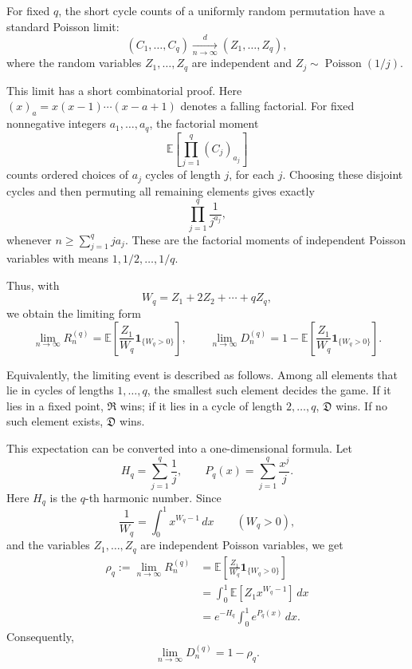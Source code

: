 \documentclass{article}
\newcommand{\Rplayer}{\mathfrak{R}}
\newcommand{\Dplayer}{\mathfrak{D}}
\begin{document}
For fixed $q$, the short cycle counts of a uniformly random permutation have
a standard Poisson limit:
\[
    (C_1,\ldots,C_q)
    \xrightarrow[n\to\infty]{d}
    (Z_1,\ldots,Z_q),
\]
where the random variables $Z_1,\ldots,Z_q$ are independent and
$Z_j\sim \operatorname{Poisson}(1/j)$.

This limit has a short combinatorial proof. Here
$(x)_a=x(x-1)\cdots(x-a+1)$ denotes a falling factorial. For fixed
nonnegative integers $a_1,\ldots,a_q$, the factorial moment
\[
    \mathbb{E}\left[\prod_{j=1}^q (C_j)_{a_j}\right]
\]
counts ordered choices of $a_j$ cycles of length $j$, for each $j$. Choosing
these disjoint cycles and then permuting all remaining elements gives exactly
\[
    \prod_{j=1}^q \frac{1}{j^{a_j}},
\]
whenever $n\ge \sum_{j=1}^q ja_j$. These are the factorial moments of
independent Poisson variables with means $1,1/2,\ldots,1/q$.

Thus, with
\[
    W_q=Z_1+2Z_2+\cdots+qZ_q,
\]
we obtain the limiting form
\[
    \lim_{n\to\infty} R_n^{(q)}
    =
    \mathbb{E}\left[
        \frac{Z_1}{W_q}\mathbf{1}_{\{W_q>0\}}
    \right],
    \qquad
    \lim_{n\to\infty} D_n^{(q)}
    =
    1-
    \mathbb{E}\left[
        \frac{Z_1}{W_q}\mathbf{1}_{\{W_q>0\}}
    \right].
\]

Equivalently, the limiting event is described as follows. Among all elements
that lie in cycles of lengths $1,\ldots,q$, the smallest such element decides
the game. If it lies in a fixed point, $\Rplayer$ wins; if it lies in a cycle
of length $2,\ldots,q$, $\Dplayer$ wins. If no such element exists,
$\Dplayer$ wins.

This expectation can be converted into a one-dimensional formula. Let
\[
    H_q=\sum_{j=1}^{q}\frac{1}{j},
    \qquad
    P_q(x)=\sum_{j=1}^{q}\frac{x^j}{j}.
\]
Here $H_q$ is the $q$-th harmonic number. Since
\[
    \frac{1}{W_q}=\int_0^1 x^{W_q-1}\,dx
    \qquad (W_q>0),
\]
and the variables $Z_1,\ldots,Z_q$ are independent Poisson variables, we get
\[
\begin{aligned}
    \rho_q
    :=
    \lim_{n\to\infty} R_n^{(q)}
    &=
    \mathbb{E}\left[
        \frac{Z_1}{W_q}\mathbf{1}_{\{W_q>0\}}
    \right]                                                  \\
    &=
    \int_0^1 \mathbb{E}\left[Z_1x^{W_q-1}\right]\,dx          \\
    &=
    e^{-H_q}\int_0^1 e^{P_q(x)}\,dx .
\end{aligned}
\]
Consequently,
\[
    \lim_{n\to\infty} D_n^{(q)}=1-\rho_q.
\]
\end{document}
